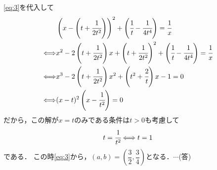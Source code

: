 \documentclass[../../main.tex]{subfiles}
\begin{document}
\cref{eq:3}を代入して
\begin{align}
  &\left(x-\left(t+\cfrac{1}{2t^2}\right)\right)^2+\left(\cfrac{1}{t}-\cfrac{1}{4t^4}\right)=\cfrac{1}{x} \\
  \Longleftrightarrow%
  &x^2-2\left(t+\cfrac{1}{2t^2}\right)x+\left(t+\cfrac{1}{2t^2}\right)^2+\left(\cfrac{1}{t}-\cfrac{1}{4t^4}\right)=\cfrac{1}{x} \\
  \Longleftrightarrow%
  &x^3-2\left(t+\cfrac{1}{2t^2}\right)x^2+\left(t^2+\cfrac{2}{t}\right)x-1=0 \\
  \Longleftrightarrow%
  &(x-t)^2\left(x-\cfrac{1}{t^2}\right)=0
\end{align}
だから，この解が$x=t$のみである条件は$t>0$も考慮して
\begin{align}
  t=\cfrac{1}{t^2}\Longleftrightarrow t=1
\end{align}
である．
この時\cref{eq:3}から，$(a,b)=\left(\dfrac{3}{2},\dfrac{3}{4}\right)$となる．$\cdots$(答)
\newpage
\end{document}
